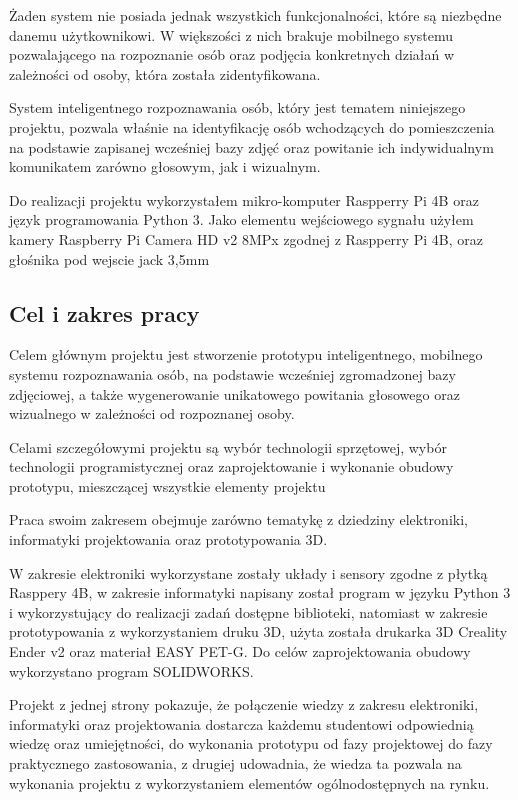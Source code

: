 \documentclass[a4paper,12pt,reqno]{article}
\begin{document}
Żaden system nie posiada jednak wszystkich funkcjonalności, które są niezbędne danemu użytkownikowi. W większości z nich brakuje mobilnego systemu pozwalającego na rozpoznanie osób oraz podjęcia konkretnych działań w zależności od osoby, która została zidentyfikowana.

System inteligentnego rozpoznawania osób, który jest tematem niniejszego projektu, pozwala właśnie na identyfikację osób wchodzących do pomieszczenia na podstawie zapisanej wcześniej bazy zdjęć oraz powitanie ich indywidualnym komunikatem zarówno głosowym, jak i wizualnym.

Do realizacji projektu wykorzystałem mikro-komputer Raspperry Pi 4B oraz język programowania Python 3. Jako elementu wejściowego sygnału użyłem kamery Raspberry Pi Camera HD v2 8MPx zgodnej z Raspperry Pi 4B, oraz głośnika pod wejscie jack 3,5mm

\subsection{Cel i zakres pracy}

Celem głównym projektu jest stworzenie prototypu inteligentnego, mobilnego systemu rozpoznawania osób, na podstawie wcześniej zgromadzonej bazy zdjęciowej, a także wygenerowanie unikatowego powitania głosowego oraz wizualnego w zależności od rozpoznanej osoby.

Celami szczegółowymi projektu są wybór technologii sprzętowej, wybór technologii programistycznej oraz zaprojektowanie i wykonanie obudowy prototypu, mieszczącej wszystkie elementy projektu

Praca swoim zakresem obejmuje zarówno tematykę z dziedziny elektroniki, informatyki projektowania oraz prototypowania 3D.

W zakresie elektroniki wykorzystane zostały układy i sensory zgodne z płytką Rasppery 4B, w zakresie informatyki napisany został program w języku Python 3 i wykorzystujący do realizacji zadań dostępne biblioteki, natomiast w zakresie prototypowania z wykorzystaniem druku 3D, użyta została drukarka 3D Creality Ender v2 oraz materiał EASY PET-G. Do celów zaprojektowania obudowy wykorzystano program SOLIDWORKS.

Projekt z jednej strony pokazuje, że połączenie wiedzy z zakresu elektroniki, informatyki oraz projektowania dostarcza każdemu studentowi odpowiednią wiedzę oraz umiejętności, do wykonania prototypu od fazy projektowej do fazy praktycznego zastosowania,  z drugiej udowadnia, że wiedza ta pozwala na wykonania projektu z wykorzystaniem elementów ogólnodostępnych na rynku.
\end{document}

